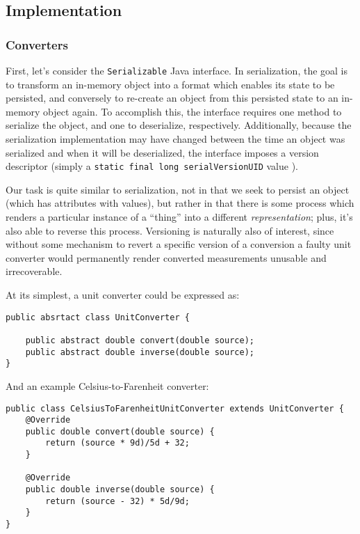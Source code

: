 \subsection{Implementation}\label{implementation}

\subsubsection{Converters}\label{converters}

First, let's consider the \texttt{Serializable} Java interface. In
serialization, the goal is to transform an in-memory object into a
format which enables its state to be persisted, and conversely to
re-create an object from this persisted state to an in-memory object
again. To accomplish this, the interface requires one method to
serialize the object, and one to deserialize, respectively.
Additionally, because the serialization implementation may have changed
between the time an object was serialized and when it will be
deserialized, the interface imposes a version descriptor (simply a
\texttt{static\ final\ long\ serialVersionUID} value ).

Our task is quite similar to serialization, not in that we seek to
persist an object (which has attributes with values), but rather in that
there is some process which renders a particular instance of a ``thing''
into a different \emph{representation}; plus, it's also able to reverse
this process. Versioning is naturally also of interest, since without
some mechanism to revert a specific version of a conversion a faulty
unit converter would permanently render converted measurements unusable
and irrecoverable.

At its simplest, a unit converter could be expressed as:

\begin{verbatim}
public absrtact class UnitConverter {

    public abstract double convert(double source);
    public abstract double inverse(double source);
}
\end{verbatim}

And an example Celsius-to-Farenheit converter:

\begin{verbatim}
public class CelsiusToFarenheitUnitConverter extends UnitConverter {
    @Override
    public double convert(double source) {
        return (source * 9d)/5d + 32;
    }

    @Override
    public double inverse(double source) {
        return (source - 32) * 5d/9d;
    }
}
\end{verbatim}

